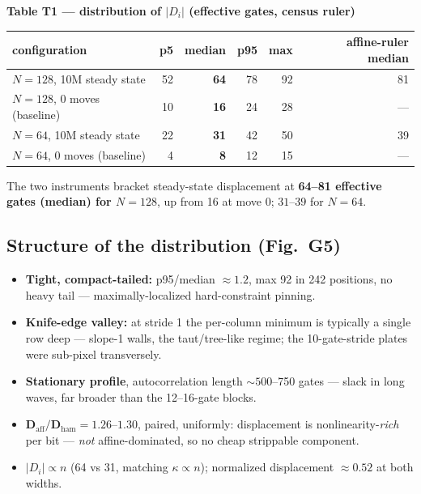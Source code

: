 \documentclass[11pt]{article}
\newcommand{\Di}{\lvert D_i\rvert}
\begin{document}
\begin{center}\small
\textbf{Table T1 --- distribution of $\Di$ (effective gates, census ruler)}\\[3pt]
\begin{tabular}{lrrrrr}
\toprule
configuration & p5 & \textbf{median} & p95 & max & affine-ruler median\\
\midrule
$N{=}128$, 10M steady state & 52 & \textbf{64} & 78 & 92 & 81\\
$N{=}128$, 0 moves (baseline) & 10 & \textbf{16} & 24 & 28 & ---\\
$N{=}64$, 10M steady state & 22 & \textbf{31} & 42 & 50 & 39\\
$N{=}64$, 0 moves (baseline) & 4 & \textbf{8} & 12 & 15 & ---\\
\bottomrule
\end{tabular}
\end{center}
The two instruments bracket steady-state displacement at \textbf{64--81 effective gates (median) for
$N{=}128$}, up from 16 at move 0; $31$--$39$ for $N{=}64$.

\subsection{Structure of the distribution (Fig.~G5)}
\begin{itemize}
\item \textbf{Tight, compact-tailed:} p95/median $\approx1.2$, max 92 in 242 positions, no heavy tail
--- maximally-localized hard-constraint pinning.
\item \textbf{Knife-edge valley:} at stride 1 the per-column minimum is typically a single row deep ---
slope-1 walls, the taut/tree-like regime; the 10-gate-stride plates were sub-pixel transversely.
\item \textbf{Stationary profile}, autocorrelation length $\sim500$--750 gates --- slack in long waves,
far broader than the 12--16-gate blocks.
\item $\mathbf{D_{\mathrm{aff}}/D_{\mathrm{ham}}=1.26}$--$1.30$, paired, uniformly: displacement is
nonlinearity-\emph{rich} per bit --- \emph{not} affine-dominated, so no cheap strippable component.
\item $\Di\propto n$ (64 vs 31, matching $\kappa\propto n$); normalized displacement $\approx0.52$ at
both widths.
\end{itemize}
\end{document}
